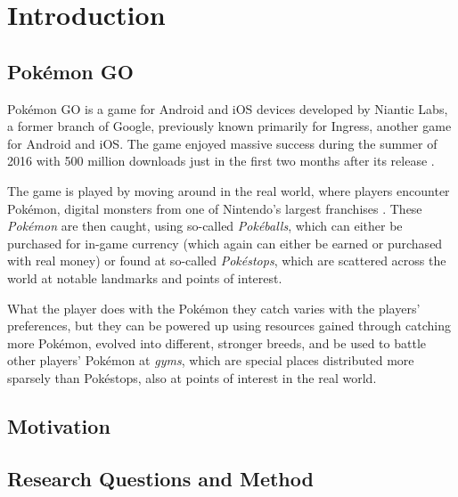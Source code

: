 
\chapter{Introduction}

\label{Chapter1}

\section{Pokémon GO}

Pokémon GO is a game for Android and iOS devices developed by Niantic Labs, a former branch of Google, previously known primarily for Ingress, another game for Android and iOS. The game enjoyed massive success during the summer of 2016 with 500 million downloads just in the first two months after its release .

The game is played by moving around in the real world, where players encounter Pokémon, digital monsters from one of Nintendo's largest franchises . These \emph{Pokémon} are then caught, using so-called \emph{Pokéballs}, which can either be purchased for in-game currency (which again can either be earned or purchased with real money) or found at so-called \emph{Pokéstops}, which are scattered across the world at notable landmarks and points of interest.

What the player does with the Pokémon they catch varies with the players' preferences, but they can be powered up using resources gained through catching more Pokémon, evolved into different, stronger breeds, and be used to battle other players' Pokémon at \emph{gyms}, which are special places distributed more sparsely than Pokéstops, also at points of interest in the real world.

\section{Motivation}


\section{Research Questions and Method}


